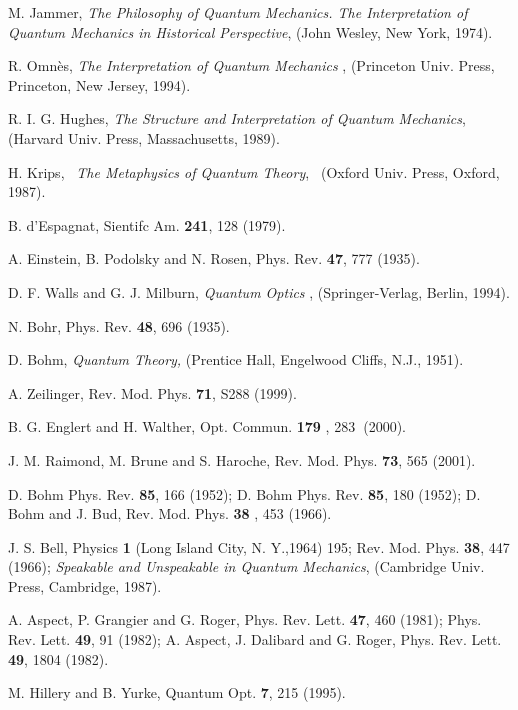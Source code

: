 \documentclass[12pt,thmsa]{article}
\begin{document}
\begin{thebibliography}{99}
 M. Jammer, \textit{The Philosophy of Quantum Mechanics.
The Interpretation of Quantum Mechanics in Historical Perspective}, (John
Wesley, New York, 1974).

 R. Omn\`{e}s, \textit{The Interpretation of Quantum Mechanics%
}, (Princeton Univ. Press, Princeton, New Jersey, 1994).

 R. I. G. Hughes, \textit{The Structure and Interpretation
of Quantum Mechanics}, (Harvard Univ. Press, Massachusetts, 1989).

 H. Krips, \textit{\ The Metaphysics of Quantum Theory},%
\textit{\ }(Oxford Univ. Press, Oxford, 1987).

 B. d'Espagnat, Sientifc Am. \textbf{241}, 128 (1979).

 A. Einstein, B. Podolsky and N. Rosen, Phys. Rev. \textbf{47},
777 (1935).

 D. F. Walls and G. J. Milburn, \textit{Quantum Optics}%
, (Springer-Verlag, Berlin, 1994).

 N. Bohr, Phys. Rev. \textbf{48}, 696 (1935).

 D. Bohm, \textit{Quantum Theory,} (Prentice Hall,
Engelwood Cliffs, N.J., 1951).

 A. Zeilinger, Rev. Mod. Phys. \textbf{71}, S288 (1999).

 B. G. Englert and H. Walther, Opt. Commun. \textbf{179}%
, 283\textbf{\ }(2000).

 J. M. Raimond, M. Brune and S. Haroche, Rev. Mod. Phys. 
\textbf{73}, 565 (2001).

 D. Bohm Phys. Rev. \textbf{85}, 166 (1952); D. Bohm Phys.
Rev. \textbf{85}, 180 (1952); D. Bohm and J. Bud, Rev. Mod. Phys. \textbf{38}%
, 453 (1966).

 J. S. Bell, Physics \textbf{1} (Long Island City, N. Y.,1964)
195; Rev. Mod. Phys. \textbf{38}, 447 (1966); \textit{Speakable and
Unspeakable in Quantum Mechanics}, (Cambridge Univ. Press, Cambridge, 1987).

 A. Aspect, P. Grangier and G. Roger, Phys. Rev. Lett. 
\textbf{47}, 460 (1981); Phys. Rev. Lett. \textbf{49}, 91 (1982); A. Aspect,
J. Dalibard and G. Roger, Phys. Rev. Lett. \textbf{49}, 1804 (1982).

 M. Hillery and B. Yurke, Quantum Opt. \textbf{7}, 215
(1995).


\end{thebibliography}
\end{document}
